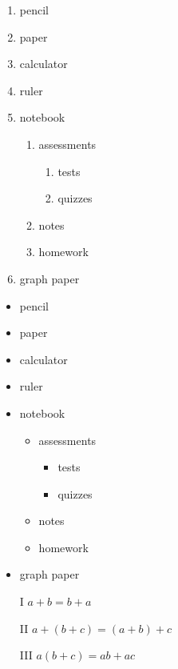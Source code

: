 \documentclass[11pt]{article}
\begin{document}
\begin{enumerate}
\item pencil 
\item paper
\item calculator
\item ruler
\item notebook 
	\begin{enumerate}
	\item assessments
		\begin{enumerate}
		\item tests
		\item quizzes
		\end{enumerate}
	\item notes
	\item homework
	\end{enumerate}
\item graph paper
\end{enumerate}

\begin{itemize}
\item pencil 
\item paper
\item calculator
\item ruler
\item notebook 
	\begin{itemize}
	\item assessments
		\begin{itemize}
		\item tests
		\item quizzes
		\end{itemize}
	\item notes
	\item homework
	\end{itemize}
\item graph paper
\end{itemize}

\begin{enumerate}
\item[I] $a+b=b+a$
\item[II] $a+(b+c)=(a+b)+c$
\item[III] $a(b+c)=ab+ac$

\end{enumerate}
\end{document}
